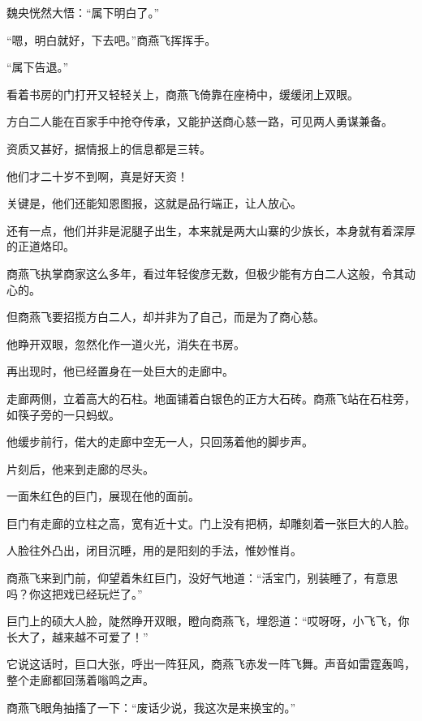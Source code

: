 \begin{this_body}
魏央恍然大悟：“属下明白了。”

“嗯，明白就好，下去吧。”商燕飞挥挥手。

“属下告退。”

看着书房的门打开又轻轻关上，商燕飞倚靠在座椅中，缓缓闭上双眼。

方白二人能在百家手中抢夺传承，又能护送商心慈一路，可见两人勇谋兼备。

资质又甚好，据情报上的信息都是三转。

他们才二十岁不到啊，真是好天资！

关键是，他们还能知恩图报，这就是品行端正，让人放心。

还有一点，他们并非是泥腿子出生，本来就是两大山寨的少族长，本身就有着深厚的正道烙印。

商燕飞执掌商家这么多年，看过年轻俊彦无数，但极少能有方白二人这般，令其动心的。

但商燕飞要招揽方白二人，却并非为了自己，而是为了商心慈。

他睁开双眼，忽然化作一道火光，消失在书房。

再出现时，他已经置身在一处巨大的走廊中。

走廊两侧，立着高大的石柱。地面铺着白银色的正方大石砖。商燕飞站在石柱旁，如筷子旁的一只蚂蚁。

他缓步前行，偌大的走廊中空无一人，只回荡着他的脚步声。

片刻后，他来到走廊的尽头。

一面朱红色的巨门，展现在他的面前。

巨门有走廊的立柱之高，宽有近十丈。门上没有把柄，却雕刻着一张巨大的人脸。

人脸往外凸出，闭目沉睡，用的是阳刻的手法，惟妙惟肖。

商燕飞来到门前，仰望着朱红巨门，没好气地道：“活宝门，别装睡了，有意思吗？你这把戏已经玩烂了。”

巨门上的硕大人脸，陡然睁开双眼，瞪向商燕飞，埋怨道：“哎呀呀，小飞飞，你长大了，越来越不可爱了！”

它说这话时，巨口大张，呼出一阵狂风，商燕飞赤发一阵飞舞。声音如雷霆轰鸣，整个走廊都回荡着嗡鸣之声。

商燕飞眼角抽搐了一下：“废话少说，我这次是来换宝的。”

\end{this_body}


